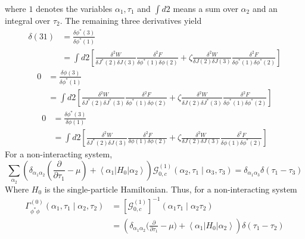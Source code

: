 \documentclass[12pt]{article}
\begin{document}
where $1$ denotes the variables ${\alpha_1,\tau_1}$ and $\int d2$ means a sum 
over $\alpha_2$ and an integral over $\tau_2$. The remaining three derivatives 
yield
\begin{equation*}
    \begin{split}
        \delta(31)&=\frac{\delta\phi^*(3)}{\delta\phi^*(1)}\\
        &=\int d2\left[\frac{\delta^2W}{\delta J^*(2)\delta J(3)}\frac
        {\delta^2F}{\delta\phi^*(1)\delta\phi(2)}+\zeta\frac{\delta^2W}{\delta
        J(2)\delta J(3)}\frac{\delta^2F}{\delta\phi^*(1)\delta\phi^*(2)}\right]
    \end{split}
\end{equation*}
\begin{equation*}
    \begin{split}
        0&=\frac{\delta\phi(3)}{\delta\phi^*(1)}\\
        &=\int d2\left[\frac{\delta^2W}{\delta J^*(2)\delta J^*(3)}\frac
        {\delta^2F}{\delta\phi^*(1)\delta\phi(2)}+\zeta\frac{\delta^2W}{\delta
        J(2)\delta J^*(3)}\frac{\delta^2F}{\delta\phi^*(1)\delta\phi^*(2)}\right]
    \end{split}
\end{equation*}
\begin{equation*}
    \begin{split}
        0&=\frac{\delta\phi^*(3)}{\delta\phi(1)}\\
        &=\int d2\left[\frac{\delta^2W}{\delta J^*(2)\delta J(3)}\frac
        {\delta^2F}{\delta\phi(1)\delta\phi(2)}+\zeta\frac{\delta^2W}{\delta
        J(2)\delta J(3)}\frac{\delta^2F}{\delta\phi(1)\delta\phi^*(2)}\right]
    \end{split}
\end{equation*}
For a non-interacting system, 
\begin{equation*}
    \sum_{\alpha_{2}}\left(\delta_{\alpha_{1} \alpha_{2}}\left(\frac{\partial}
    {\partial \tau_{1}}-\mu\right)+\left\langle\alpha_{1}\left|H_{0}\right| 
    \alpha_{2}\right\rangle\right) \mathcal{G}_{0, c}^{(1)}\left(\alpha_{2}, \tau_{1} 
    \mid \alpha_{3}, \tau_{3}\right)=\delta_{\alpha_{1} \alpha_{3}} \delta
    \left(\tau_{1}-\tau_{3}\right)
\end{equation*}
Where $H_0$ is the single-particle Hamiltonian. Thus, for a non-interacting 
system
\begin{equation*}
    \begin{aligned}
        \Gamma_{\phi^{*} \phi}^{(0)}\left(\alpha_{1}, \tau_{1} \mid \alpha_{2}, 
        \tau_{2}\right) &=[\mathcal{G}_{0, c}^{(1)}]^{-1}\left(\alpha_{1} 
        \tau_{1} \mid \alpha_{2} \tau_{2}\right) \\
        &=\left(\delta_{\alpha_{1} \alpha_{2}}\Big(\frac{\partial}{\partial 
        \tau_{1}}-\mu\Big)+\left\langle\alpha_{1}\left|H_{0}\right| 
        \alpha_{2}\right\rangle\right) \delta\left(\tau_{1}-\tau_{2}\right)
    \end{aligned}
\end{equation*}
\end{document}
